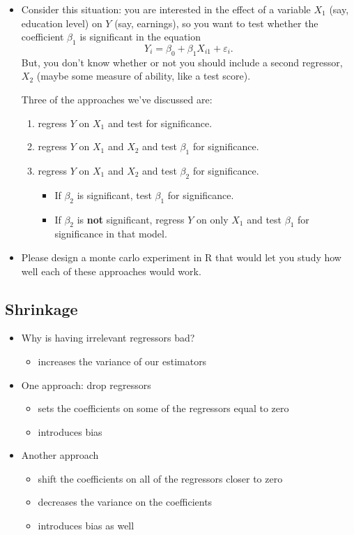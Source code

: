 \begin{itemize}
\item Consider this situation: you are interested in the effect of a
        variable $X_1$ (say, education level) on $Y$ (say, earnings),
        so you want to test whether the coefficient $\beta_{1}$ is
        significant in the equation
        \[ Y_{i} = \beta_{0} + \beta_{1} X_{i1} + \varepsilon_{i}. \]
        But, you don't know whether or not you should include a second
        regressor, $X_{2}$ (maybe some measure of ability, like a test
        score).

        Three of the approaches we've discussed are:
\begin{enumerate}
\item regress $Y$ on $X_{1}$ and test for significance.
\item regress $Y$ on $X_{1}$ and $X_{2}$ and test $\beta_{1}$ for
           significance.
\item regress $Y$ on $X_{1}$ and $X_{2}$ and test $\beta_{2}$ for
           significance.
\begin{itemize}
\item If $\beta_{2}$ is significant, test $\beta_{1}$ for
             significance.
\item If $\beta_{2}$ is \textbf{not} significant, regress $Y$ on only
             $X_{1}$ and test $\beta_{1}$ for significance in that
             model.
\end{itemize}
\end{enumerate}
\item Please design a monte carlo experiment in R that would let you
        study how well each of these approaches would work.
\end{itemize}
\subsection{Shrinkage}
\label{sec-2-3}

\begin{itemize}
\item Why is having irrelevant regressors bad?
\begin{itemize}
\item increases the variance of our estimators
\end{itemize}
\item One approach: drop regressors
\begin{itemize}
\item sets the coefficients on some of the regressors equal to zero
\item introduces bias
\end{itemize}
\item Another approach
\begin{itemize}
\item shift the coefficients on all of the regressors closer to zero
\item decreases the variance on the coefficients
\item introduces bias as well
\end{itemize}
\end{itemize}
